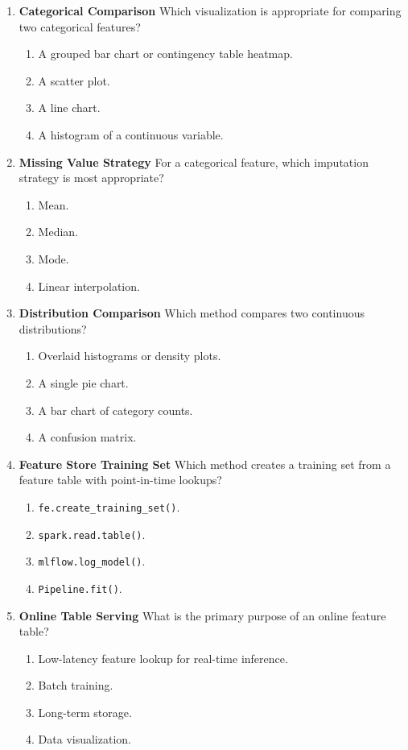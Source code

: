 \documentclass{article}
\begin{document}
\begin{enumerate}[label=\textbf{Q\arabic*.}]
		\item \textbf{Categorical Comparison}
		Which visualization is appropriate for comparing two categorical features?
		\begin{enumerate}[label=\Alph*.]
			\item A grouped bar chart or contingency table heatmap.
			\item A scatter plot.
			\item A line chart.
			\item A histogram of a continuous variable.
		\end{enumerate}
		
		\item \textbf{Missing Value Strategy}
		For a categorical feature, which imputation strategy is most appropriate?
		\begin{enumerate}[label=\Alph*.]
			\item Mean.
			\item Median.
			\item Mode.
			\item Linear interpolation.
		\end{enumerate}
		
		\item \textbf{Distribution Comparison}
		Which method compares two continuous distributions?
		\begin{enumerate}[label=\Alph*.]
			\item Overlaid histograms or density plots.
			\item A single pie chart.
			\item A bar chart of category counts.
			\item A confusion matrix.
		\end{enumerate}
		
		\item \textbf{Feature Store Training Set}
		Which method creates a training set from a feature table with point-in-time lookups?
		\begin{enumerate}[label=\Alph*.]
			\item \texttt{fe.create\_training\_set()}.
			\item \texttt{spark.read.table()}.
			\item \texttt{mlflow.log\_model()}.
			\item \texttt{Pipeline.fit()}.
		\end{enumerate}
		
		\item \textbf{Online Table Serving}
		What is the primary purpose of an online feature table?
		\begin{enumerate}[label=\Alph*.]
			\item Low-latency feature lookup for real-time inference.
			\item Batch training.
			\item Long-term storage.
			\item Data visualization.
		\end{enumerate}
		

\end{enumerate}
\end{document}
